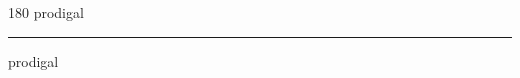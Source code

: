 
\begin{frame}
\begin{center}
\begin{turn}{180}
{\fontsize{2.5cm}{1em}\selectfont prodigal}
\end{turn}
\vspace{1em}\par  
\hrule
\vspace{1em}\par  
{\fontsize{2.5cm}{1em}\selectfont prodigal}
\end{center}
\end{frame}
